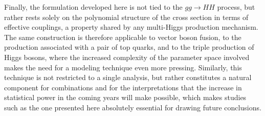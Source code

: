 Finally, the formulation developed here is not tied to the $gg\to HH$ process, but rather rests solely on the polynomial structure of the cross section in terms of effective couplings, a property shared by any multi-Higgs production mechanism. The same construction is therefore applicable to vector boson fusion, to the production associated with a pair of top quarks, and to the triple production of Higgs bosons, where the increased complexity of the parameter space involved makes the need for a modeling technique even more pressing. Similarly, this technique is not restricted to a single analysis, but rather constitutes a natural component for combinations and for the interpretations that the increase in statistical power in the coming years will make possible, which makes studies such as the one presented here absolutely essential for drawing future conclusions.
